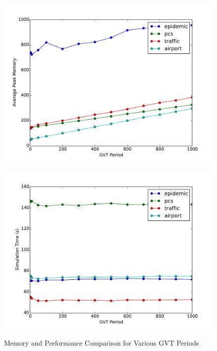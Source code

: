 \documentclass[11pt]{book}
\begin{document}
\begin{figure}
  \begin{minipage}{.5\textwidth}
    \begin{center}
      \includegraphics[width=\textwidth,keepaspectratio,quiet]{figs/fossil_collection/memory_fcw.pdf} \\
    \end{center}
  \end{minipage}%
  \hfill
  \begin{minipage}{.5\textwidth}
    \begin{center}
      \includegraphics[width=\textwidth,keepaspectratio,quiet]{figs/fossil_collection/time_fcw.pdf} \\
    \end{center}
  \end{minipage}
  \caption{Memory and Performance Comparison for Various GVT Periods}\label{fc_memory_analysis}
\end{figure}
\end{document}
